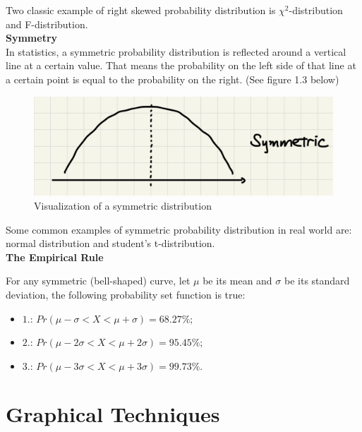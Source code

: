 \noindent
Two classic example of right skewed probability distribution is $\chi^{2}$-distribution and F-distribution.\\

\noindent
\textbf{Symmetry}\\

\noindent
In statistics, a symmetric probability distribution is reflected around a vertical line at a certain value. That means the probability on the left side of that line at a certain point is equal to the probability on the right. (See figure 1.3 below)

\begin{figure}[H]
 \centering
 \includegraphics[scale=0.25]{Section1/img/Symmetric.jpg}
 \caption{Visualization of a symmetric distribution}
\end{figure}

\noindent
Some common examples of symmetric probability distribution in real world are: normal distribution and student's t-distribution.\\

\noindent
\textbf{The Empirical Rule}
\begin{definition}
  For any symmetric (bell-shaped) curve, let $\mu$ be its mean and $\sigma$ be its standard deviation, the following probability set function is true:
   \begin{itemize}
    \item  $1.$: $Pr(\mu - \sigma < X < \mu + \sigma) = 68.27\%;$
    \item  $2.$: $Pr(\mu - 2\sigma < X < \mu + 2\sigma) = 95.45\%;$
    \item  $3.$: $Pr(\mu - 3\sigma < X < \mu + 3\sigma) = 99.73\%.$
   \end{itemize}
  \end{definition}

\section{Graphical Techniques}\\

